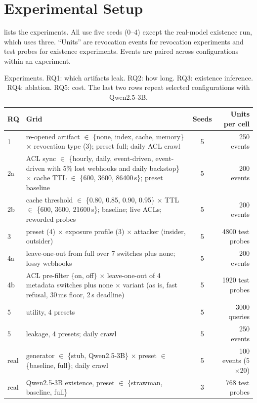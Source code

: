 \section{Experimental Setup}
\label{sec:setup}

 lists the experiments. All use five seeds (0--4) except the real-model existence run, which uses three. ``Units'' are revocation events for revocation experiments and test probes for existence experiments. Events are paired across configurations within an experiment.

\begin{table}[tbp]
\centering
\caption{Experiments. RQ1: which artifacts leak. RQ2: how long. RQ3: existence inference. RQ4: ablation. RQ5: cost. The last two rows repeat selected configurations with Qwen2.5-3B.}
\label{tab:grid}
\small
\begin{tabular}{@{}lp{10.2cm}cr@{}}
\toprule
RQ & Grid & Seeds & Units per cell \\
\midrule
1 & re-opened artifact $\in$ \{none, index, cache, memory\} $\times$ revocation type (3); preset full; daily ACL crawl & 5 & 250 events \\
2a & ACL sync $\in$ \{hourly, daily, event-driven, event-driven with 5\% lost webhooks and daily backstop\} $\times$ cache TTL $\in$ \{600, 3600, 86400\,s\}; preset baseline & 5 & 200 events \\
2b & cache threshold $\in$ \{0.80, 0.85, 0.90, 0.95\} $\times$ TTL $\in$ \{600, 3600, 21600\,s\}; baseline; live ACLs; reworded probes & 5 & 200 events \\
3 & preset (4) $\times$ exposure profile (3) $\times$ attacker (insider, outsider) & 5 & 4800 test probes \\
4a & leave-one-out from full over 7 switches plus none; lossy webhooks & 5 & 200 events \\
4b & ACL pre-filter $\{$on, off$\}$ $\times$ leave-one-out of 4 metadata switches plus none $\times$ variant (as is, fast refusal, 30\,ms floor, 2\,s deadline) & 5 & 1920 test probes \\
5 & utility, 4 presets & 5 & 3000 queries \\
5 & leakage, 4 presets; daily crawl & 5 & 250 events \\
real & generator $\in$ \{stub, Qwen2.5-3B\} $\times$ preset $\in$ \{baseline, full\}; daily crawl & 5 & 100 events (5$\times$20) \\
real & Qwen2.5-3B existence, preset $\in$ \{strawman, baseline, full\} & 3 & 768 test probes \\

\end{tabular}
\end{table}
